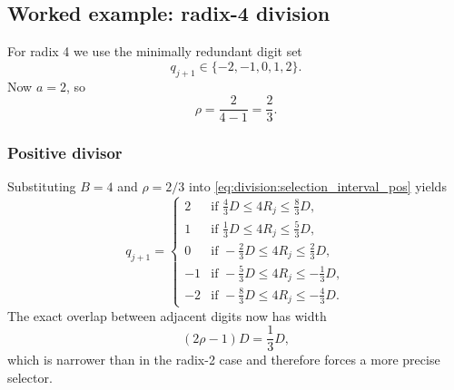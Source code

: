 \documentclass[11pt]{article}
\numberwithin{equation}{section}
\begin{document}
\subsection{Worked example: radix-4 division}
\label{ssec:division:radix4}

For radix 4 we use the minimally redundant digit set
\[
  q_{j+1} \in \{-2,-1,0,1,2\}.
\]
Now $a=2$, so
\begin{equation}
  \label{eq:division:radix4_rho}
  \rho = \frac{2}{4-1} = \frac{2}{3}.
\end{equation}

\subsubsection{Positive divisor}
\label{sssec:division:radix4_pos}

Substituting $B=4$ and $\rho=2/3$ into \cref{eq:division:selection_interval_pos} yields
\begin{equation}
  \label{eq:division:radix4_intervals_pos}
  q_{j+1} =
  \begin{cases}
    2  & \text{if } \frac{4}{3}D \le 4R_j \le \frac{8}{3}D, \\
    1  & \text{if } \frac{1}{3}D \le 4R_j \le \frac{5}{3}D, \\
    0  & \text{if } -\frac{2}{3}D \le 4R_j \le \frac{2}{3}D, \\
    -1 & \text{if } -\frac{5}{3}D \le 4R_j \le -\frac{1}{3}D, \\
    -2 & \text{if } -\frac{8}{3}D \le 4R_j \le -\frac{4}{3}D.
  \end{cases}
\end{equation}
The exact overlap between adjacent digits now has width
\[
  (2\rho-1)D = \frac{1}{3}D,
\]
which is narrower than in the radix-2 case and therefore forces a more precise selector.
\end{document}
